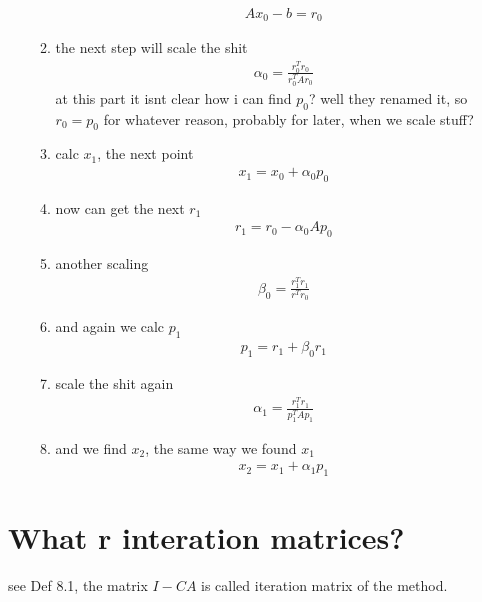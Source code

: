 \documentclass[]{scrartcl}
\newcommand{\<}{\trianglelefteq}
\begin{document}
\begin{itemize}
\begin{enumerate}
		\begin{align*}
			Ax_0 - b = r_0
		\end{align*}
		\item the next step will scale the shit
		\begin{align*}
			\alpha_0 = \frac{r^T_0 r_0}{r_0^T A r_0}
		\end{align*}
		at this part it isnt clear how i can find $p_0$? well they renamed it, so $r_0 = p_0$ for whatever reason, probably for later, when we scale stuff? %
		\item calc $x_1$, the next point
		\begin{align*}
			x_1 = x_0 + \alpha_0 p_0
		\end{align*}
		\item now can get the next $r_1$
		\begin{align*}
			r_1 = r_0 - \alpha_0 A p_0
		\end{align*}
		\item another scaling
		\begin{align*}
			\beta_0 = \frac{r_1^T r_1}{r^T r_0}
		\end{align*}
		\item and again we calc $p_1$
		\begin{align*}
			p_1 = r_1 + \beta_0 r_1
		\end{align*}
		\item scale the shit again
		\begin{align*}
			\alpha_1 = \frac{r_1^T r_1}{p_1^T A p_1}
		\end{align*}
		\item and we find $x_2$, the same way we found $x_1$
		\begin{align*}
			x_2 = x_1 + \alpha_1 p_1
		\end{align*}
	\end{enumerate}
\end{itemize}

\section*{What r interation matrices?}
see Def 8.1, the matrix $I-CA$ is called iteration matrix of the method.
\end{document}
